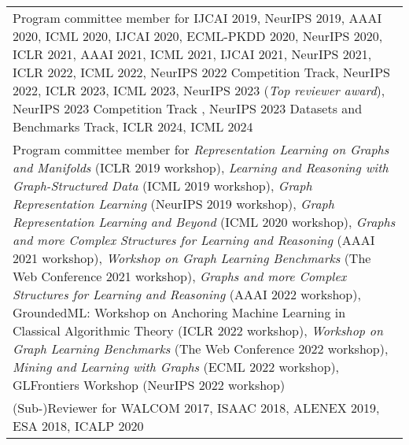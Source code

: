 \documentclass[11pt, a4paper, DIV=14, headings=small]{scrartcl}
\begin{document}
\begin{longtabu}{p{14.5cm}}
		Program committee member for IJCAI 2019, NeurIPS  2019, AAAI 2020, ICML 2020, IJCAI 2020, ECML-PKDD 2020, NeurIPS 2020, ICLR 2021, AAAI 2021, ICML 2021, IJCAI 2021, NeurIPS 2021, ICLR 2022, ICML 2022, NeurIPS 2022 Competition Track, NeurIPS 2022, ICLR 2023, ICML 2023, NeurIPS 2023 (\emph{Top reviewer award}), NeurIPS 2023 Competition Track , NeurIPS 2023 Datasets and Benchmarks Track, ICLR 2024, ICML 2024 \\
		
		Program committee member for \emph{Representation Learning on Graphs and Manifolds} (ICLR 2019 workshop), \emph{Learning and Reasoning with Graph-Structured Data} (ICML 2019 workshop), \emph{Graph Representation Learning} (NeurIPS 2019 workshop), \emph{Graph Representation Learning and Beyond} (ICML 2020 workshop), \emph{Graphs and more Complex Structures for Learning and Reasoning} (AAAI 2021 workshop), \emph{Workshop on Graph Learning Benchmarks} (The Web Conference 2021 workshop),  \emph{Graphs and more Complex Structures for Learning and Reasoning} (AAAI 2022 workshop), GroundedML: Workshop on Anchoring Machine Learning in Classical Algorithmic Theory (ICLR 2022 workshop), \emph{Workshop on Graph Learning Benchmarks} (The Web Conference 2022 workshop), \emph{Mining and Learning with Graphs} (ECML 2022 workshop), GLFrontiers Workshop (NeurIPS 2022 workshop) \\
		
		
		(Sub-)Reviewer for WALCOM 2017, ISAAC 2018, ALENEX 2019, ESA 2018, ICALP 2020                                                                                                                                                                                                                                                                                                                                                                                                                                                                                                                                                                                                                                                                                                                                                                                                                 \\
		

\end{longtabu}
\end{document}
